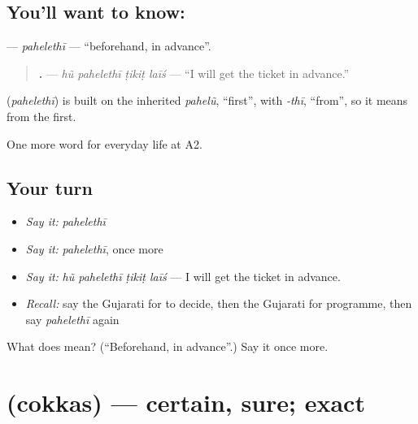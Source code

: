 \subsection*{You'll want to know: }
\textbf{} — \emph{pahelethī} — \textquotedblleft{}beforehand, in advance\textquotedblright{}.

\begin{quote}
\textbf{   .} — \emph{hũ pahelethī ṭikiṭ laīś} — \textquotedblleft{}I will get the ticket in advance.\textquotedblright{}
\end{quote}

\begin{cousinweb}
\textbf{} (\emph{pahelethī}) is built on the inherited \emph{pahelũ}, \textquotedblleft{}first\textquotedblright{}, with \emph{-thī}, \textquotedblleft{}from\textquotedblright{}, so it means from the first.
\end{cousinweb}

\begin{grammarlens}[title={What you've built}]
One more word for everyday life at A2.
\end{grammarlens}

\subsection*{Your turn}
\begin{itemize}
\raggedright
  \item \emph{Say it:} \emph{pahelethī}
  \item \emph{Say it:} \emph{pahelethī}, once more
  \item \emph{Say it:} \emph{hũ pahelethī ṭikiṭ laīś} — I will get the ticket in advance.
  \item \emph{Recall:} say the Gujarati for to decide, then the Gujarati for programme, then say \emph{pahelethī} again
\end{itemize}

\begin{tcolorbox}[breakable,colback=teal!4,colframe=teal!35!black,title={Before you move on}]
What does  mean? (\textquotedblleft{}Beforehand, in advance\textquotedblright{}.) Say it once more.
\end{tcolorbox}
\section[\texorpdfstring{\gu{ચોક્કસ} (cokkas)}{ચોક્કસ (cokkas)}]{ (cokkas) — certain, sure; exact}

